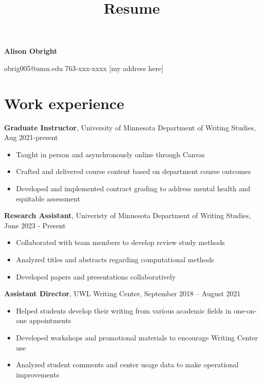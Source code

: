 \documentclass[
]{report}
\title{Resume}
\author{}
\date{}
\providecommand{\tightlist}{%
  \setlength{\itemsep}{0pt}\setlength{\parskip}{0pt}}\usepackage{longtable,booktabs,array}
\begin{document}
\maketitle
\ifdefined\Shaded\renewenvironment{Shaded}{\begin{tcolorbox}[sharp corners, interior hidden, enhanced, boxrule=0pt, borderline west={3pt}{0pt}{shadecolor}, breakable, frame hidden]}{\end{tcolorbox}}\fi

\textbf{Alison Obright}

obrig005@umn.edu \textbar{} 763-xxx-xxxx \textbar{} {[}my address
here{]}

\hypertarget{work-experience}{%
\section{Work experience}\label{work-experience}}

\textbf{Graduate Instructor}, University of Minnesota Department of
Writing Studies, Aug 2021-present

\begin{itemize}
\tightlist
\item
  Taught in person and asynchronously online through Canvas
\item
  Crafted and delivered course content based on department course
  outcomes
\item
  Developed and implemented contract grading to address mental health
  and equitable assessment
\end{itemize}

\textbf{Research Assistant}, Univeristy of Minnesota Department of
Writing Studies, June 2023 - Present

\begin{itemize}
\tightlist
\item
  Collaborated with team members to develop review study methods
\item
  Analyzed titles and abstracts regarding computational methods
\item
  Developed papers and presentations collaboratively
\end{itemize}

\textbf{Assistant Director}, UWL Writing Center, September 2018 --
August 2021

\begin{itemize}
\tightlist
\item
  Helped students develop their writing from various academic fields in
  one-on-one appointments
\item
  Developed workshops and promotional materials to encourage Writing
  Center use
\item
  Analyzed student comments and center usage data to make operational
  improvements
\end{itemize}
\end{document}
